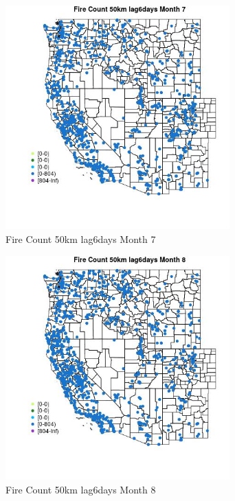 \begin{figure} 
\centering  
\includegraphics[width=0.77\textwidth]{Code_Outputs/Report_ML_input_PM25_Step4_part_f_de_duplicated_aves_prioritize_24hr_obswNAs_MapObsMo7Fire_Count_50km_lag6days.jpg} 
\caption{\label{fig:Report_ML_input_PM25_Step4_part_f_de_duplicated_aves_prioritize_24hr_obswNAsMapObsMo7Fire_Count_50km_lag6days}Fire Count 50km lag6days Month 7} 
\end{figure} 
 

\clearpage 

\begin{figure} 
\centering  
\includegraphics[width=0.77\textwidth]{Code_Outputs/Report_ML_input_PM25_Step4_part_f_de_duplicated_aves_prioritize_24hr_obswNAs_MapObsMo8Fire_Count_50km_lag6days.jpg} 
\caption{\label{fig:Report_ML_input_PM25_Step4_part_f_de_duplicated_aves_prioritize_24hr_obswNAsMapObsMo8Fire_Count_50km_lag6days}Fire Count 50km lag6days Month 8} 
\end{figure} 
 

